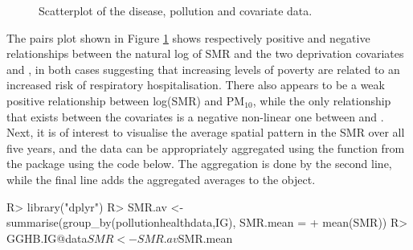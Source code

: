\documentclass[article, nojss]{jss}
\begin{document}
\begin{figure}
\centering 
{}
\caption{Scatterplot of the disease, pollution and covariate data.\label{pollution_scatterplot}}
\end{figure} 


The pairs plot shown in Figure \ref{pollution_scatterplot} shows respectively positive and negative relationships between the natural log of SMR and the two deprivation covariates  and , in both cases suggesting that increasing levels of poverty are related to an increased risk of respiratory hospitalisation. There also appears to be a weak positive relationship between log(SMR) and PM$_{10}$, while the only relationship that exists between the covariates  is a negative non-linear one between  and . Next, it is of interest to visualise the average spatial pattern in the SMR over all five years, and the data can be appropriately aggregated using the  function from the  package using the code below. The aggregation is done by the second line, while the final line adds the aggregated averages to the   object.


\begin{Schunk}
\begin{Sinput}
R> library("dplyr")
R> SMR.av <- summarise(group_by(pollutionhealthdata,IG), SMR.mean = 
+     mean(SMR))
R> GGHB.IG@data$SMR <- SMR.av$SMR.mean
\end{Sinput}
\end{Schunk}
\end{document}
